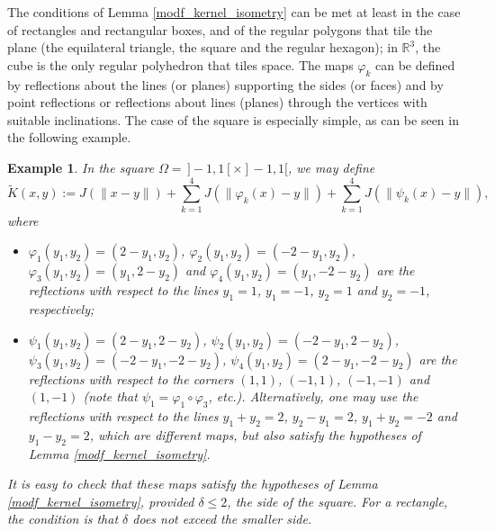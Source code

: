 \documentclass[a4paper,12pt]{amsart}
\newtheorem{ex}[theorem]{Example}
\newcommand{\R}{\mathbb{R}}
\begin{document}
  The conditions of {Lemma \ref{modf_kernel_isometry}} can be met at least in the case of {rectangles and rectangular boxes, and of the regular polygons that tile the plane (the equilateral triangle, the square and the regular hexagon); in $\R^3$, the cube is the only regular polyhedron that tiles space.} The maps $\varphi_k$ can be defined by reflections about the lines (or planes) supporting the sides (or faces) and {by point reflections or reflections about} lines (planes) through the vertices with suitable inclinations. The case of the {square} is {especially} simple, as can be seen in the following example.

     \begin{ex}
   In the square ${\Omega = \,]-1,1[ \times ]-1,1[}$, we may define
  \[
   {\tilde K(x,y) := J(\|x-y\|) + \sum_{k=1}^4 J(\|\varphi_k(x)-y\|) + \sum_{k=1}^4 J(\|\psi_k(x)-y\|)},
   \]
   where
   \begin{itemize}
   \item $ \varphi_1(y_1, y_2)=  (2-y_1, y_2) $,
  $ \varphi_2(y_1, y_2)= (-2 -y_1, y_2)  $,  $ \varphi_3(y_1, y_2)=
   (y_1, 2-y_2)$  and $ \varphi_4(y_1, y_2)= (y_1, -2-y_2)$ are the reflections with respect to the lines  $y_1 =1$, $y_1=-1$,  $y_2 = 1$ and $y_2 = -1$,
    respectively;
    \item  $ \psi_1(y_1, y_2) = (2-y_1, 2-y_2) $,
    $ \psi_2(y_1, y_2) = (-2-y_1, 2-y_2) $, $ \psi_3(y_1, y_2) = (-2-y_1, -2-y_2) $, $ \psi_4(y_1, y_2) = (2-y_1, -2-y_2) $
      are the reflections with respect to the corners $(1,1)$,
      $(-1,1)$, $(-1,-1) $ and  $(1,-1)$ {(note that $\psi_1 = \varphi_1\circ\varphi_3$, etc.). Alternatively, one may use the reflections with respect to the lines $y_1+y_2=2$, $y_2-y_1=2$, $y_1+y_2=-2$ and $y_1-y_2=2$, which are different maps, but also satisfy the hypotheses of Lemma \ref{modf_kernel_isometry}.}
      \end{itemize}
 It is easy to check that these maps satisfy the hypotheses of
  Lemma \ref{modf_kernel_isometry}, {provided $\delta \leq 2$, the side of the square. For a rectangle, the condition is that $\delta$ does not exceed the smaller side.}
    \end{ex}
\end{document}
